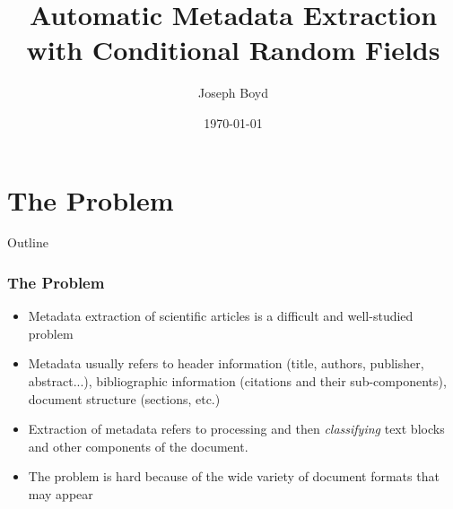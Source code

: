 \documentclass{beamer}
\title[Automatic Metadata Extraction]{Automatic Metadata Extraction with Conditional Random Fields} %
\author{Joseph Boyd} %
\institute[EPFL] %
{
\'Ecole Polytechnique F\'eq\'erale de Lausanne \\ %
\medskip
\textit{joseph.boyd@epfl.ch} %
}
\date{\today} %
\begin{document}
\begin{frame}
\titlepage %
\end{frame}


\section{The Problem}
\begin{frame}[noframenumbering]{Outline}
\end{frame}


\begin{frame}
\frametitle{The Problem}
\begin{itemize}
\item Metadata extraction of scientific articles is a difficult and well-studied problem
\item Metadata usually refers to header information (title, authors, publisher, abstract...), bibliographic information (citations and their sub-components), document structure (sections, etc.)
\item Extraction of metadata refers to processing and then \emph{classifying} text blocks and other components of the document.
\item The problem is hard because of the wide variety of document formats that may appear
\end{itemize}
\end{frame}
\end{document}
